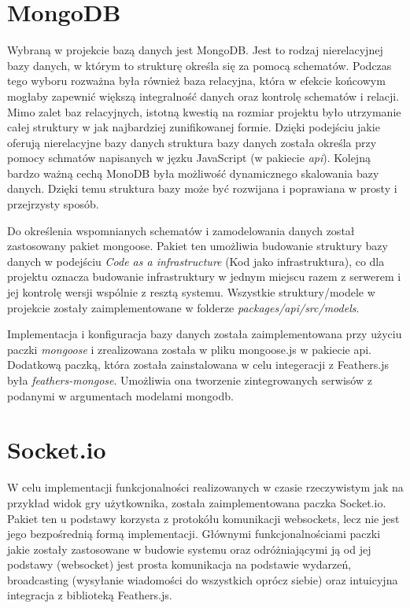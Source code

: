 \section{MongoDB}
Wybraną w projekcie bazą danych jest MongoDB. Jest to rodzaj nierelacyjnej bazy danych, w którym to strukturę określa się za pomocą schematów. Podczas tego wyboru rozważna była również baza relacyjna, która w efekcie końcowym mogłaby zapewnić większą integralność danych oraz kontrolę schematów i relacji. Mimo zalet baz relacyjnych, istotną kwestią na rozmiar projektu było utrzymanie całej struktury w jak najbardziej zunifikowanej formie. Dzięki podejściu jakie oferują nierelacyjne bazy danych struktura bazy danych została określa przy pomocy schmatów napisanych w jęzku JavaScript (w pakiecie \textit{api}). Kolejną bardzo ważną cechą MonoDB była możliwość dynamicznego skalowania bazy danych. Dzięki temu struktura bazy może być rozwijana i poprawiana w prosty i przejrzysty sposób.

Do określenia wspomnianych schematów i zamodelowania danych został zastosowany pakiet mongoose. Pakiet ten umożliwia budowanie struktury bazy danych w podejściu \textit{Code as a infrastructure} (Kod jako infrastruktura), co dla projektu oznacza budowanie infrastruktury w jednym miejscu razem z serwerem i jej kontrolę wersji wspólnie z resztą systemu. Wszystkie struktury/modele w projekcie zostały zaimplementowane w folderze \textit{packages/api/src/models}.

Implementacja i konfiguracja bazy danych została zaimplementowana przy użyciu paczki \textit{mongoose} i zrealizowana została w pliku mongoose.js w pakiecie api. Dodatkową paczką, która została zainstalowana w celu integeracji z Feathers.js była \textit{feathers-mongose}. Umożliwia ona tworzenie zintegrowanych serwisów z podanymi w argumentach modelami mongodb.

\section{Socket.io}
W celu implementacji funkcjonalności realizowanych w czasie rzeczywistym jak na przykład widok gry użytkownika, została zaimplementowana paczka Socket.io. Pakiet ten u podstawy korzysta z protokółu komunikacji websockets, lecz nie jest jego bezpośrednią formą implementacji. Głównymi funkcjonalnościami paczki jakie zostały zastosowane w budowie systemu oraz odróżniającymi ją od jej podstawy (websocket) jest prosta komunikacja na podstawie wydarzeń, broadcasting (wysyłanie wiadomości do wszystkich oprócz siebie) oraz intuicyjna integracja z biblioteką Feathers.js.

